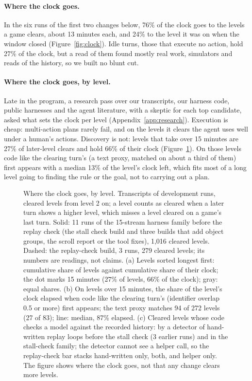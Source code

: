 \paragraph{Where the clock goes.}
In the six runs of the first two changes below, 76\% of the clock goes to the levels a game clears, about 13 minutes each, and 24\% to the level it was on when the window closed (Figure~\ref{fig:clock}). %
Idle turns, those that execute no action, hold 27\% of the clock, but a read of them found mostly real work, simulators and reads of the history, so we built no blunt cut. %

\paragraph{Where the clock goes, by level.}
Late in the program, a research pass over our transcripts, our harness code, public harnesses and the agent literature, with a skeptic for each top candidate, asked what sets the clock per level (Appendix~\ref{app:research}). %
Execution is cheap: multi-action plans rarely fail, and on the levels it clears the agent uses well under a human's actions. %
Discovery is not: levels that take over 15 minutes are 27\% of later-level clears and hold 66\% of their clock (Figure~\ref{fig:discovery}). %
On those levels code like the clearing turn's (a text proxy, matched on about a third of them) first appears with a median 13\% of the level's clock left, which fits most of a long level going to finding the rule or the goal, not to carrying out a plan. %

\begin{figure}[t]
\centering
{}
\caption{Where the clock goes, by level. Transcripts of development runs, cleared levels from level 2 on; a level counts as cleared when a later turn shows a higher level, which misses a level cleared on a game's last turn. Solid: 11 runs of the 15-stream harness family before the replay check (the stall check build and three builds that add object groups, the scroll report or the tool fixes), 1,016 cleared levels. Dashed: the replay-check build, 3 runs, 279 cleared levels; its numbers are readings, not claims. (a) Levels sorted longest first: cumulative share of levels against cumulative share of their clock; the dot marks 15 minutes (27\% of levels, 66\% of the clock); gray: equal shares. (b) On levels over 15 minutes, the share of the level's clock elapsed when code like the clearing turn's (identifier overlap 0.5 or more) first appears; the text proxy matches 94 of 272 levels (27 of 83); line: median, 87\% elapsed. (c) Cleared levels whose code checks a model against the recorded history: by a detector of hand-written replay loops before the stall check (3 earlier runs) and in the stall-check family; the detector cannot see a helper call, so the replay-check bar stacks hand-written only, both, and helper only. The figure shows where the clock goes, not that any change clears more levels.}\label{fig:discovery} %
\end{figure}

